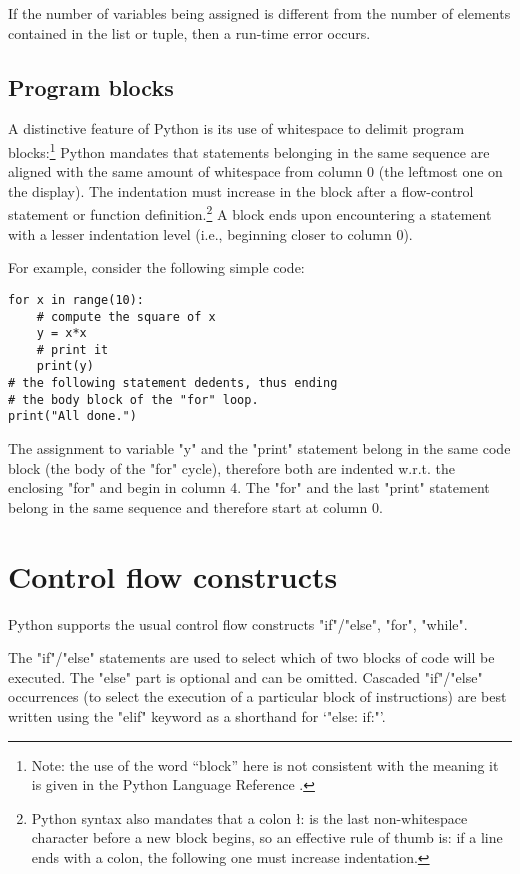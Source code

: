{If the number of variables being assigned is different from the number
of elements contained in the list or tuple, then a run-time error
occurs.


\subsection{Program blocks}
\label{sec:blocks}

A distinctive feature of Python is its use of whitespace to delimit
program blocks:\footnote{Note: the use of the word ``block'' here is
  not consistent with the meaning it is given in the Python Language
  Reference \cite{python:reference}.}  Python mandates that statements
belonging in the same sequence are aligned with the same amount of
whitespace from column 0 (the leftmost one on the display).  The
indentation must increase in the block after a flow-control statement
or function definition.\footnote{Python syntax also mandates that a
  colon \l{:} is the last non-whitespace character before a new block
  begins, so an effective rule of thumb is: if a line ends with a
  colon, the following one must increase indentation.}  A block ends
upon encountering a statement with a lesser indentation level (i.e.,
beginning closer to column 0).

For example, consider the following simple code:
\begin{lstlisting}
for x in range(10):
    # compute the square of x
    y = x*x
    # print it
    print(y)
# the following statement dedents, thus ending
# the body block of the "for" loop.
print("All done.")
\end{lstlisting}
The assignment to variable "y" and the "print" statement belong in the
same code block (the body of the "for" cycle), therefore both are
indented w.r.t. the enclosing "for" and begin in column 4.  The "for"
and the last "print" statement belong in the same sequence and
therefore start at column 0.


\section{Control flow constructs}
\label{sec:control-flow}

Python supports the usual control flow constructs
"if"/"else", "for", "while".

The "if"/"else" statements are used to select which of two
blocks of code will be executed.  The "else" part is optional and
can be omitted.  Cascaded "if"/"else" occurrences (to
select the execution of a particular block of instructions) are best
written using the "elif" keyword as a shorthand for 
`"else: if:"'. 

}
